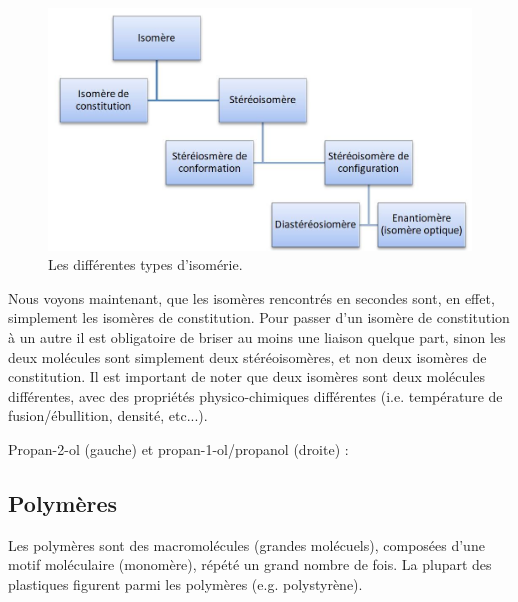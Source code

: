 \documentclass[11pt,a4paper]{article}
\begin{document}
\begin{figure}[H]
    \centering
    \includegraphics[width=0.85\linewidth]{imgs/c5/isomeres2.jpg}
    \caption{Les différentes types d'isomérie.}
\end{figure}

Nous voyons maintenant, que les isomères rencontrés en secondes sont, en effet, simplement les isomères de constitution. Pour passer d'un isomère de constitution à un autre il est obligatoire de briser au moins une liaison quelque part, sinon les deux molécules sont simplement deux stéréoisomères, et non deux isomères de constitution. Il est important de noter que deux isomères sont deux molécules différentes, avec des propriétés physico-chimiques différentes (i.e. température de fusion/ébullition, densité, etc...).

\begin{eg} 

Propan-2-ol (gauche) et propan-1-ol/propanol (droite) : 
\quad \quad {}
\end{eg}

\subsection{Polymères}

Les polymères sont des macromolécules (grandes molécuels), composées d'une motif moléculaire (monomère), répété un grand nombre de fois. La plupart des plastiques figurent parmi les polymères (e.g. polystyrène). 
\end{document}
